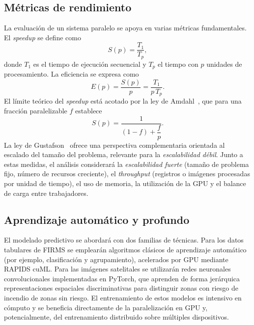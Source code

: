 \subsection{Métricas de rendimiento}
La evaluación de un sistema paralelo se apoya en varias métricas fundamentales. El \textit{speedup} se define como
\begin{equation}
S(p) = \frac{T_1}{T_p},
\label{eq:speedup}
\end{equation}
donde $T_1$ es el tiempo de ejecución secuencial y $T_p$ el tiempo con $p$ unidades de procesamiento. La eficiencia se expresa como
\begin{equation}
E(p) = \frac{S(p)}{p} = \frac{T_1}{p\,T_p}.
\label{eq:eff}
\end{equation}
El límite teórico del \textit{speedup} está acotado por la ley de Amdahl~\cite{amdahl1967}, que para una fracción paralelizable $f$ establece
\begin{equation}
S(p) = \frac{1}{(1-f) + \dfrac{f}{p}}.
\label{eq:amdahl}
\end{equation}
La ley de Gustafson~\cite{gustafson1988} ofrece una perspectiva complementaria orientada al escalado del tamaño del problema, relevante para la \textit{escalabilidad débil}. Junto a estas medidas, el análisis considerará la \textit{escalabilidad fuerte} (tamaño de problema fijo, número de recursos creciente), el \textit{throughput} (registros o imágenes procesadas por unidad de tiempo), el uso de memoria, la utilización de la GPU y el balance de carga entre trabajadores.

\subsection{Aprendizaje automático y profundo}
El modelado predictivo se abordará con dos familias de técnicas. Para los datos tabulares de FIRMS se emplearán algoritmos clásicos de aprendizaje automático (por ejemplo, clasificación y agrupamiento), acelerados por GPU mediante RAPIDS cuML. Para las imágenes satelitales se utilizarán redes neuronales convolucionales implementadas en PyTorch, que aprenden de forma jerárquica representaciones espaciales discriminativas para distinguir zonas con riesgo de incendio de zonas sin riesgo. El entrenamiento de estos modelos es intensivo en cómputo y se beneficia directamente de la paralelización en GPU y, potencialmente, del entrenamiento distribuido sobre múltiples dispositivos.

